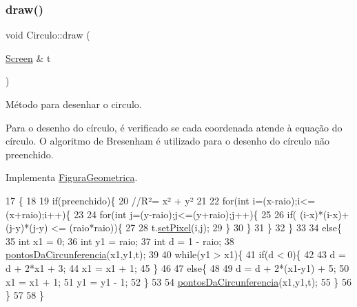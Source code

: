 \subsubsection{\texorpdfstring{draw()}{draw()}}
{\footnotesize\ttfamily void Circulo\+::draw (\begin{DoxyParamCaption}\item[{\mbox{\hyperlink{class_screen}{Screen}} \&}]{t }\end{DoxyParamCaption})\hspace{0.3cm}{\ttfamily [virtual]}}



Método para desenhar o circulo. 

Para o desenho do círculo, é verificado se cada coordenada atende à equação do círculo. O algoritmo de Bresenham é utilizado para o desenho do círculo não preenchido. 

Implementa \mbox{\hyperlink{class_figura_geometrica_a8ee8dedc060b6059a805ea091aef2c41}{Figura\+Geometrica}}.


\begin{DoxyCode}
17                            \{
18 
19     \textcolor{keywordflow}{if}(preenchido)\{
20         \textcolor{comment}{//R²= x² + y²}
21 
22         \textcolor{keywordflow}{for}(\textcolor{keywordtype}{int} i=(x-raio);i<=(x+raio);i++)\{
23 
24             \textcolor{keywordflow}{for}(\textcolor{keywordtype}{int} j=(y-raio);j<=(y+raio);j++)\{
25 
26                 \textcolor{keywordflow}{if}( (i-x)*(i-x)+(j-y)*(j-y) <= (raio*raio))\{
27 
28                     t.\mbox{\hyperlink{class_screen_ae6bea81c57a22d226507c3c26fa95ee0}{setPixel}}(i,j);
29                 \}
30             \}
31         \}
32     \}
33 
34     \textcolor{keywordflow}{else}\{
35         \textcolor{keywordtype}{int} x1 = 0;
36         \textcolor{keywordtype}{int} y1 = raio;
37         \textcolor{keywordtype}{int} d = 1 - raio;
38         \mbox{\hyperlink{class_circulo_a197439e429d6636a4a43d77e02b20486}{pontosDaCircunferencia}}(x1,y1,t);
39 
40         \textcolor{keywordflow}{while}(y1 > x1)\{
41             \textcolor{keywordflow}{if}(d < 0)\{
42 
43                 d = d + 2*x1 + 3;
44                 x1 = x1 + 1;
45             \}
46 
47             \textcolor{keywordflow}{else}\{
48 
49                 d = d + 2*(x1-y1) + 5;
50                 x1 = x1 + 1;
51                 y1 = y1 - 1;
52             \}
53 
54             \mbox{\hyperlink{class_circulo_a197439e429d6636a4a43d77e02b20486}{pontosDaCircunferencia}}(x1,y1,t);
55         \}
56     \}
57 
58 \}
\end{DoxyCode}
\mbox{\label{class_circulo_a197439e429d6636a4a43d77e02b20486}} 
